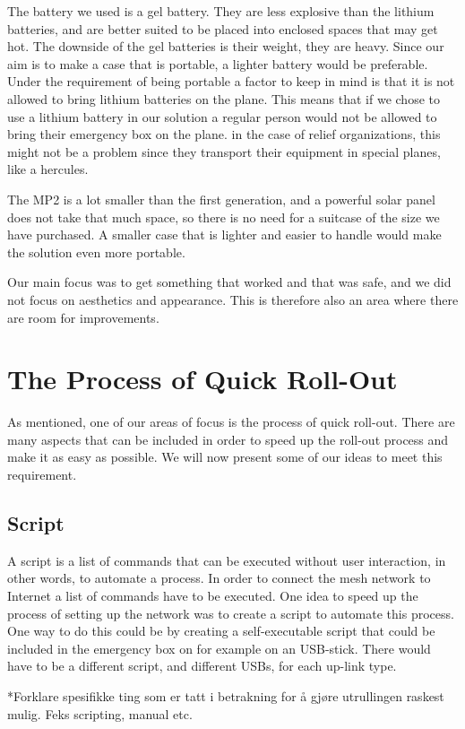 The battery we used is a gel battery. They are less explosive than the lithium batteries, and are better suited to be placed into enclosed spaces that may get hot. The downside of the gel batteries is their weight, they are heavy. Since our aim is to make a case that is portable, a lighter battery would be preferable. Under the requirement of being portable a factor to keep in mind is that it is not allowed to bring lithium batteries on the plane. This means that if we chose to use a lithium battery in our solution a regular person would not be allowed to bring their emergency box on the plane. in the case of relief organizations, this might not be a problem since they transport their equipment in special planes, like a hercules. 

The MP2 is a lot smaller than the first generation, and a powerful solar panel does not take that much space, so there is no need for a suitcase of the size we have purchased. A smaller case that is lighter and easier to handle would make the solution even more portable. 

Our main focus was to get something that worked and that was safe, and we did not focus on aesthetics and appearance. This is therefore also an area where there are room for improvements. 


\section{The Process of Quick Roll-Out}
As mentioned, one of our areas of focus is the process of quick roll-out. There are many aspects that can be included in order to speed up the roll-out process and make it as easy as possible. We will now present some of our ideas to meet this requirement.

\subsection{Script}
A script is a list of commands that can be executed without user interaction, in other words, to automate a process. In order to connect the mesh network to Internet a list of commands have to be executed. One idea to speed up the process of setting up the network was to create a script to automate this process. One way to do this could be by creating a self-executable script that could be included in the emergency box on for example on an USB-stick. There would have to be a different script, and different USBs, for each up-link type. 

*Forklare spesifikke ting som er tatt i betrakning for å gjøre utrullingen raskest mulig. Feks scripting, manual etc. 

